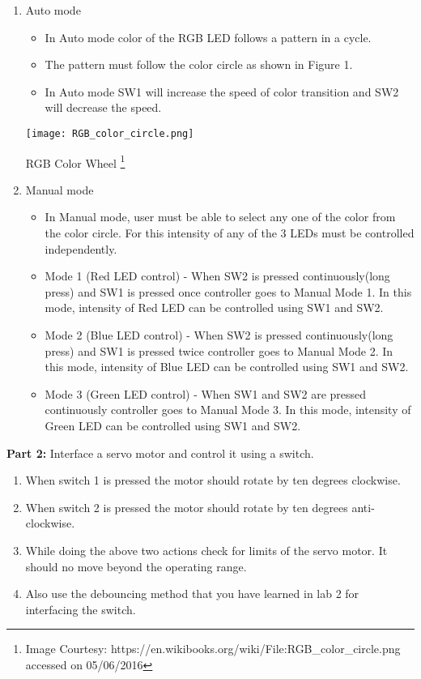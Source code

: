 \documentclass{article} %
\begin{document}
\begin{enumerate}
\item Auto mode
\begin{itemize}
  \item In Auto mode color of the RGB LED follows a pattern in a cycle.
  \item The pattern must follow the color circle as shown in Figure 1.
  \item In Auto mode SW1 will increase the speed of color transition and SW2 will decrease the speed.
\end{itemize}

\centerline{\texttt{[image: RGB\_color\_circle.png]}}
RGB Color Wheel
\footnote{Image Courtesy: https://en.wikibooks.org/wiki/File:RGB\_color\_circle.png accessed on 05/06/2016}

\item Manual mode
\begin{itemize}

\item In Manual mode, user must be able to select any one of the color from the color circle. For this
intensity of any of the 3 LEDs must be controlled independently.
\item Mode 1 (Red LED control) - When SW2 is pressed continuously(long press) and SW1 is pressed
once controller goes to Manual Mode 1. In this mode, intensity of Red LED can be controlled using
SW1 and SW2.
\item Mode 2 (Blue LED control) - When SW2 is pressed continuously(long press) and SW1 is pressed
twice controller goes to Manual Mode 2. In this mode, intensity of Blue LED can be controlled using
SW1 and SW2.
\item Mode 3 (Green LED control) - When SW1 and SW2 are pressed continuously controller goes to
Manual Mode 3. In this mode, intensity of Green LED can be controlled using SW1 and SW2.
\end{itemize}

\end{enumerate}
\textbf{Part 2:}
Interface a servo motor and control it using a switch.
\begin{enumerate}
\item When switch 1 is pressed the motor should rotate by ten degrees clockwise.
\item When switch 2 is pressed the motor should rotate by ten degrees anti-clockwise.
\item While doing the above two actions check for limits of the servo motor. It should no move beyond the operating range.
\item Also use the debouncing method that you have learned in lab 2 for interfacing the switch.
\end{enumerate}
\end{document}
